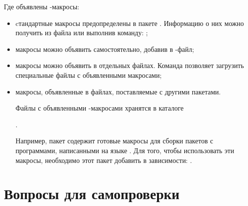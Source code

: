 Где объявлены -макросы:
\begin{itemize}
	\item cтандартные макросы предопределены в пакете .
		Информацию о них можно получить из файла  или выполнив
		команду: ;
	 \item макросы можно объявить самостоятельно, добавив в -файл;
	 \item макросы можно объявить в отдельных файлах.
	 	Команда  позволяет загрузить специальные файлы с объявленными макросами;
	 \item макросы, объявленные в файлах, поставляемые с другими пакетами.

	 Файлы с объявленными -макросами хранятся в каталоге

	.

	 Например, пакет  содержит готовые макросы для сборки пакетов с программами, написанными на языке .
	 Для того, чтобы использовать эти макросы, необходимо этот пакет добавить в зависимости:
	 .
\end{itemize}



\section{Вопросы для самопроверки}


